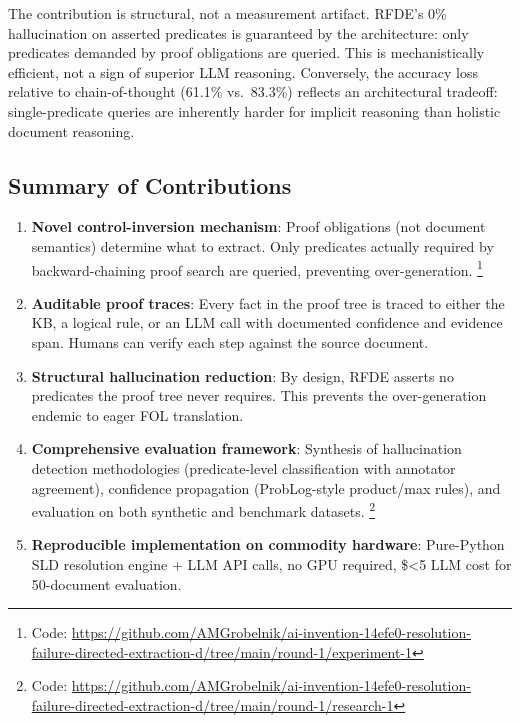 \documentclass[11pt,letterpaper]{article}
\begin{document}
The contribution is structural, not a measurement artifact. RFDE's 0\% hallucination on
asserted predicates is guaranteed by the architecture: only predicates demanded by proof
obligations are queried. This is mechanistically efficient, not a sign of superior LLM
reasoning. Conversely, the accuracy loss relative to chain-of-thought (61.1\% vs.\ 83.3\%)
reflects an architectural tradeoff: single-predicate queries are inherently harder for
implicit reasoning than holistic document reasoning.

\subsection{Summary of Contributions}

\begin{enumerate}
  \item \textbf{Novel control-inversion mechanism}: Proof obligations (not document semantics)
    determine what to extract. Only predicates actually required by backward-chaining proof
    search are queried, preventing over-generation.%
    \footnote{Code: \url{https://github.com/AMGrobelnik/ai-invention-14efe0-resolution-failure-directed-extraction-d/tree/main/round-1/experiment-1}}

  \item \textbf{Auditable proof traces}: Every fact in the proof tree is traced to either the
    KB, a logical rule, or an LLM call with documented confidence and evidence span. Humans
    can verify each step against the source document.

  \item \textbf{Structural hallucination reduction}: By design, RFDE asserts no predicates the
    proof tree never requires. This prevents the over-generation endemic to eager FOL
    translation.

  \item \textbf{Comprehensive evaluation framework}: Synthesis of hallucination detection
    methodologies (predicate-level classification with annotator agreement), confidence
    propagation (ProbLog-style product/max rules), and evaluation on both synthetic and
    benchmark datasets.%
    \footnote{Code: \url{https://github.com/AMGrobelnik/ai-invention-14efe0-resolution-failure-directed-extraction-d/tree/main/round-1/research-1}}

  \item \textbf{Reproducible implementation on commodity hardware}: Pure-Python SLD resolution
    engine + LLM API calls, no GPU required, \$<5 LLM cost for 50-document evaluation.
\end{enumerate}
\end{document}
